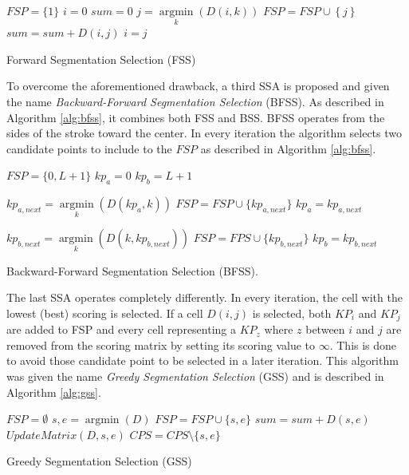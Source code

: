 \documentclass[10pt, conference, compsocconf]{IEEEtran}
\begin{document}
\begin{algorithm}
$FSP = \{1\} $\;
$i=0$\;
$sum=0$\;
{
	$j = \mathop {\arg \min }\limits_k \left( {D\left( {i,k} \right)} \right)$\;
	$FSP = FSP \cup \left\{ j \right\}$\;
	$sum = sum + D\left( {i,j} \right)$\;
	$i=j$\;
}
\caption{Forward Segmentation Selection (FSS)}
\label{alg:fss}
\end{algorithm}

To overcome the aforementioned drawback, a third SSA is proposed and given the name \emph{Backward-Forward Segmentation Selection} (BFSS). As described in Algorithm \ref{alg:bfss}, it combines both FSS and BSS. BFSS operates from the sides of the stroke toward the center. In every iteration the algorithm selects two candidate points to include to the $FSP$ as described in Algorithm \ref{alg:bfss}. \\

\begin{algorithm}
$FSP = \{0,L+1\}$\;
$kp_{a}=0$\;
$kp_{b}=L+1$\;
{
	$kp_{a,next} = \mathop {\arg \min}\limits_k (D(kp_a,k))$\;
	$FSP = FSP \cup \{kp_{a,next}\}$\;
	$kp_{a}=kp_{a,next}$\;
	
	$kp_{b,next} = \mathop {\arg \min}\limits_k (D(k,kp_{b,next}))$\;
	$FSP = FPS \cup \{kp_{b,next}\}$\;	
	$kp_{b}=kp_{b,next}$\;
}

\caption{Backward-Forward Segmentation Selection (BFSS).}
\label{alg:bfss}
\end{algorithm}
  
The last SSA operates completely differently. In every iteration, the cell with the lowest (best) scoring is selected. If a cell $D(i,j)$ is selected, both $KP_{i}$ and $KP_{j}$ are added to FSP and every cell representing a $KP_{z}$ where $z$ between $i$ and $j$ are removed from the scoring matrix by setting its scoring value to $\infty$. This is done to avoid those candidate point to be selected in a later iteration. This algorithm was given the name \emph{Greedy Segmentation Selection} (GSS) and is described in Algorithm \ref{alg:gss}.\\

\begin{algorithm}
$FSP=\emptyset$\;
{
	${s,e} = \mathop {\arg \min}(D)$\;
	$FSP = FSP \cup \{s,e\}$\;
	$sum = sum + D(s,e)$\;
	$UpdateMatrix(D,s,e)$\;
	$CPS = CPS\setminus\{s,e\}$\;
}

\caption{Greedy Segmentation Selection (GSS)}
\label{alg:gss}
\end{algorithm}
\end{document}
